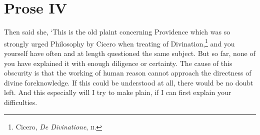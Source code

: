 \section{Prose IV}

Then said she, `This is the old plaint concerning Providence which was
so strongly urged Philosophy by Cicero when treating of
Divination,\footnote{Cicero, \textit{De Divinatione}, \textsc{ii}.}
and you yourself have often and at length questioned the same subject.
But so far, none of you have explained it with enough diligence or
certainty. The cause of this obscurity is that the working of human
reason cannot approach the directness of divine foreknowledge. If this
could be understood at all, there would be no doubt left. And this
especially will I try to make plain, if I can first explain your
difficulties.

